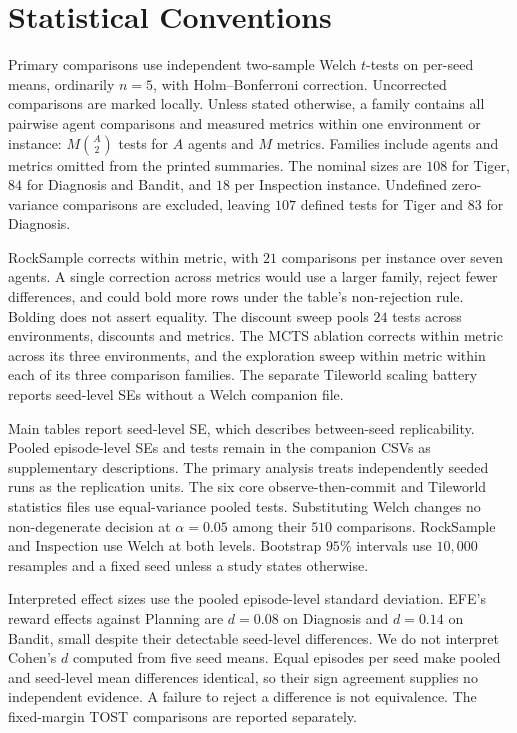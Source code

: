 \documentclass[manuscript, screen, review]{jair}
\begin{document}
\FloatBarrier

\section{Statistical Conventions}
\label{app:stats}

Primary comparisons use independent two-sample Welch $t$-tests on per-seed means, ordinarily $n=5$, with Holm--Bonferroni correction. Uncorrected comparisons are marked locally. Unless stated otherwise, a family contains all pairwise agent comparisons and measured metrics within one environment or instance: $M\binom{A}{2}$ tests for $A$ agents and $M$ metrics. Families include agents and metrics omitted from the printed summaries. The nominal sizes are $108$ for Tiger, $84$ for Diagnosis and Bandit, and $18$ per Inspection instance. Undefined zero-variance comparisons are excluded, leaving $107$ defined tests for Tiger and $83$ for Diagnosis.

RockSample corrects within metric, with $21$ comparisons per instance over seven agents. A single correction across metrics would use a larger family, reject fewer differences, and could bold more rows under the table's non-rejection rule. Bolding does not assert equality. The discount sweep pools $24$ tests across environments, discounts and metrics. The MCTS ablation corrects within metric across its three environments, and the exploration sweep within metric within each of its three comparison families. The separate Tileworld scaling battery reports seed-level SEs without a Welch companion file.

Main tables report seed-level SE, which describes between-seed replicability. Pooled episode-level SEs and tests remain in the companion CSVs as supplementary descriptions. The primary analysis treats independently seeded runs as the replication units. The six core observe-then-commit and Tileworld statistics files use equal-variance pooled tests. Substituting Welch changes no non-degenerate decision at $\alpha=0.05$ among their $510$ comparisons. RockSample and Inspection use Welch at both levels. Bootstrap $95\%$ intervals use $10{,}000$ resamples and a fixed seed unless a study states otherwise.

Interpreted effect sizes use the pooled episode-level standard deviation. EFE's reward effects against Planning are $d=0.08$ on Diagnosis and $d=0.14$ on Bandit, small despite their detectable seed-level differences. We do not interpret Cohen's $d$ computed from five seed means. Equal episodes per seed make pooled and seed-level mean differences identical, so their sign agreement supplies no independent evidence. A failure to reject a difference is not equivalence. The fixed-margin TOST comparisons are reported separately.
\end{document}
